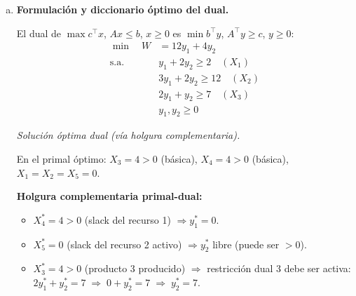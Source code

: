 \documentclass{article}
\begin{document}
\begin{enumerate}[a)]
\textit{Reconstrucción de la función objetivo.} Sea $Z^{(0)}=c_1X_1+c_2X_2+c_3X_3$. Tras sustituir $X_3$:
$$Z = c_3(4) + (c_1-2c_3)X_1+(c_2-2c_3)X_2 - c_3 X_5$$
Igualando con $Z=28-12X_1-2X_2-7X_5$:
\begin{align*}
4c_3 &= 28 \quad\Rightarrow\quad c_3=7\\
c_1-2(7)&=-12 \quad\Rightarrow\quad c_1=2\\
c_2-2(7)&=-2  \quad\Rightarrow\quad c_2=12
\end{align*}

\textbf{Problema original:}
$$\begin{aligned}
\max\quad Z &= 2X_1+12X_2+7X_3 \\
\text{s.a.}\quad &X_1+3X_2+2X_3\leq12 \quad\text{(recurso 1, holgura }X_4\text{)}\\
&2X_1+2X_2+X_3\leq4  \quad\text{(recurso 2, holgura }X_5\text{)}\\
&X_1,X_2,X_3\geq0
\end{aligned}$$

\textit{Verificación:} con $(X_1,X_2,X_3)=(0,0,4)$: rest.1: $8\leq12$ \checkmark, rest.2: $4\leq4$ \checkmark; $Z=28$ \checkmark.

\item \textbf{Formulación y diccionario óptimo del dual.}

El dual de $\max c^\top x$, $Ax\leq b$, $x\geq0$ es $\min b^\top y$, $A^\top y\geq c$, $y\geq0$:
$$\begin{aligned}
\min\quad W &= 12y_1+4y_2 \\
\text{s.a.}\quad
&y_1+2y_2\geq2 \quad(X_1)\\
&3y_1+2y_2\geq12\quad(X_2)\\
&2y_1+y_2\geq7  \quad(X_3)\\
&y_1,y_2\geq0
\end{aligned}$$

\textit{Solución óptima dual (vía holgura complementaria).}

En el primal óptimo: $X_3=4>0$ (básica), $X_4=4>0$ (básica), $X_1=X_2=X_5=0$.

\textbf{Holgura complementaria primal-dual:}
\begin{itemize}
  \item $X_4^*=4>0$ (slack del recurso 1) $\Rightarrow y_1^*=0$.
  \item $X_5^*=0$ (slack del recurso 2 activo) $\Rightarrow y_2^*$ libre (puede ser $>0$).
  \item $X_3^*=4>0$ (producto 3 producido) $\Rightarrow$ restricción dual 3 debe ser activa:
        $2y_1^*+y_2^*=7 \;\Rightarrow\; 0+y_2^*=7 \;\Rightarrow\; y_2^*=7$.
\end{itemize}


\end{enumerate}
\end{document}
